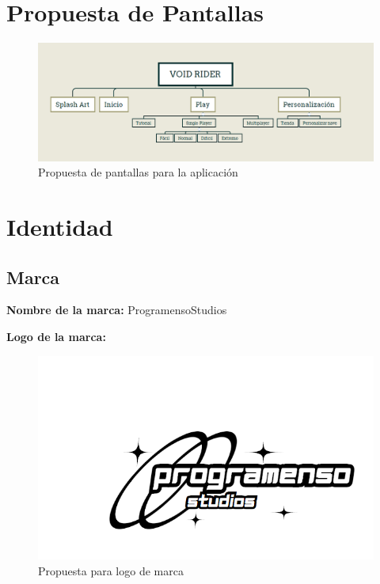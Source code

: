 \documentclass[12pt]{article} %
\begin{document}
\section{Propuesta de Pantallas}\label{pantallas}
\begin{figure} [!htb]
  \includegraphics[width=\linewidth]{PantallasVoid.png}
  \caption{Propuesta de pantallas para la aplicación}
\end{figure}

\section{Identidad}\label{identidad}
\subsection{Marca}
\par \textbf{Nombre de la marca:}  ProgramensoStudios
\newpage
\par \textbf{Logo de la marca:}
\begin{figure} [!htb]
  \includegraphics[width=\linewidth]{progralogo.png}
  \caption{Propuesta para logo de marca}
\end{figure}
\FloatBarrier
\newpage
\end{document}
